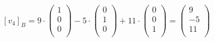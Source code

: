 \documentclass[
    11pt,
    a4paper,
    oneside,
    headinlcude, footinclude,
    twoside,
]{report}
\begin{document}
\begin{itemize}
            $$
                [v_{4}]_{B} =
                9 \cdot \left( 
                    \begin{array}{c} 
                        1\\
                        0\\
                        0\\ 
                    \end{array} 
                \right)
                -5 \cdot \left( 
                    \begin{array}{c} 
                        0\\
                        1\\
                        0\\ 
                    \end{array}
                \right)
                +11 \cdot \left( 
                    \begin{array}{c} 
                        0\\
                        0\\
                        1\\ 
                    \end{array}
                \right)
                = \left( 
                    \begin{array}{c} 
                        9\\
                        -5\\
                        11\\ 
                    \end{array} 
                \right)
            $$
\end{itemize}
\end{document}
